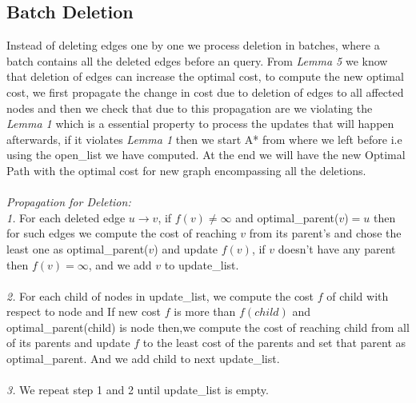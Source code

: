 \documentclass[a4paper]{article}
\begin{document}
\subsection{Batch Deletion}
Instead of deleting edges one by one we process deletion in batches, where a batch contains all the deleted edges before an query. From \textit{Lemma 5} we know that deletion of edges can increase the optimal cost, to compute the new optimal cost, we first propagate the change in cost due to deletion of edges to all affected nodes and then we check that due to this propagation are we violating the \textit{Lemma 1} which is a essential property to process the updates that will happen afterwards, if it violates \textit{Lemma 1} then we start A* from where we left before i.e using the open\_list we have computed. At the end we will have the new Optimal Path with the optimal cost for new graph encompassing all the deletions.\\
\\
\textit{Propagation for Deletion:}\\
\textit{1.} For each deleted edge $u \rightarrow v$, if $f(v) \neq \infty$ and optimal\_parent($v$)$=u$ then for such edges we compute the cost of reaching $v$ from its parent's and chose the least one as optimal\_parent($v$) and update $f(v)$, if $v$ doesn't have any parent then $f(v)=\infty$, and we add $v$ to update\_list.\\
\\\textit{2.} For each child of nodes in update\_list, we compute the cost $f$ of child with respect to node and If new cost $f$ is more than $f(child)$ and optimal\_parent(child)  is node
     then,we compute the cost of reaching child from all of its parents and update $f$ to the least cost of the parents and set that parent as optimal\_parent. And we add child to next update\_list.\\
 \\  
\textit{3.} We repeat step 1 and 2 until update\_list is empty.\\
\\
\end{document}
